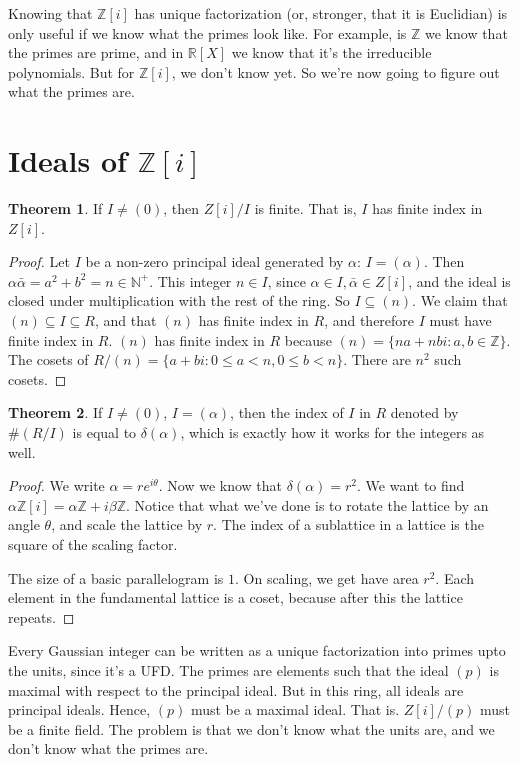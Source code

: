 \documentclass{book}
\newcommand{\N}{\ensuremath{\mathbb{N}}}
\newcommand{\Z}{\ensuremath{\mathbb{Z}}}
\newcommand{\R}{\ensuremath{\mathbb{R}}}
\theoremstyle{definition}
\newtheorem{theorem}{Theorem}
\begin{document}
Knowing that $\Z[i]$ has unique factorization (or, stronger, that it is Euclidian)
is only useful if we know what the primes look like. For example, is $\Z$
we know that the primes are prime, and in $\R[X]$ we know that it's the 
irreducible polynomials. But for $\Z[i]$, we don't know yet. So we're now
going to figure out what the primes are.

\section{Ideals of $\Z[i]$}

\begin{theorem}
If $I \neq (0)$, then $Z[i]/I$ is finite. That is, $I$ has finite index in $Z[i]$.
\end{theorem}
\begin{proof}
Let $I$ be a non-zero principal ideal generated by $\alpha$: 
$I = (\alpha)$. Then $\alpha \bar \alpha = a^2 + b^2 = n \in \N^+$.
This integer $n \in I$, since $\alpha \in I, \bar \alpha \in Z[i]$, and the ideal
is closed under multiplication with the rest of the ring. So $I \subseteq (n)$.
We claim that $(n) \subseteq I \subseteq R$, and that $(n)$ has finite index
in $R$, and therefore $I$ must have finite index in $R$. $(n)$ has finite
index in $R$ because $(n) = \{ n a + n b i : a, b \in \Z \}$. The cosets
of $R/(n) = \{ a + bi : 0 \leq a < n, 0 \leq b < n \}$. There are $n^2$ such
cosets.
\end{proof}

\begin{theorem}
If $I \neq (0)$, $I = (\alpha)$, then the index of $I$ in $R$ denoted by
$\#(R/I)$ is equal to $\delta(\alpha)$,
which is exactly how it works for the integers as well.
\end{theorem}
\begin{proof}
We write $\alpha = re^{i \theta}$. Now we know that $\delta(\alpha) = r^2$.
We want to find $\alpha \Z[i] = \alpha \Z + i \beta \Z$. Notice that
what we've done is to rotate the lattice by an angle $\theta$, and scale the lattice by $r$.
The index of a sublattice in a lattice is the square of the scaling factor. 

The size of a basic parallelogram is $1$. On scaling, we get have area $r^2$.
Each element in the fundamental lattice is a coset, because after this
the lattice repeats.
\end{proof}

Every Gaussian integer can be written as a unique factorization into primes
upto the units, since it's a UFD. The primes are elements such that the ideal $(p)$ is maximal
with respect to the principal ideal. But in this ring, all ideals are principal
ideals. Hence, $(p)$ must be a maximal ideal. That is. $Z[i]/(p)$ must be
a finite field. The problem is that we don't know what the units are, and we don't
know what the primes are. 
\end{document}
